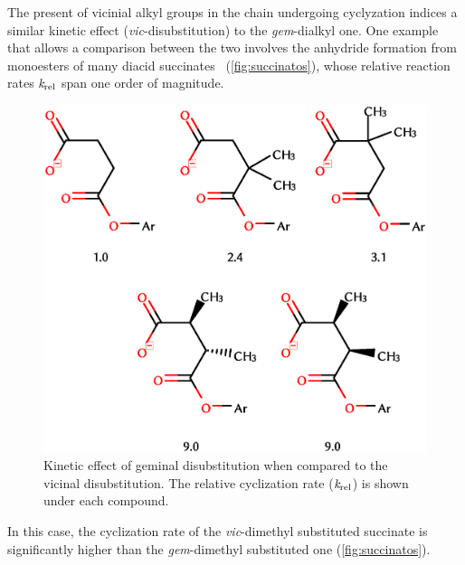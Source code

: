The present of vicinial alkyl groups in the chain undergoing cyclyzation
indices a similar kinetic effect (\emph{vic}-disubstitution)
to the \emph{gem}-dialkyl one.
One example that allows a comparison between the two
involves the anhydride formation from monoesters of many diacid
succinates~\cite{Kirby_1980,Bruice_1960a,Bruice_1960b,Bruice_1965,Lightstone_1994}
(\autoref{fig:succinatos}), whose relative reaction rates
$\emph{k}_\text{rel}$ span one order of magnitude.
%
\begin{figure}[hbtp]
    \centering
    \includegraphics[width=.75\textwidth]{figures/succinatos}
    \caption[Kinetic effects of geminal and vicinal disubstitutions.]{
        Kinetic effect of geminal disubstitution when compared to the vicinal disubstitution.
        The relative cyclization rate ($\emph{k}_\text{rel}$)
        is shown under each compound.}\label{fig:succinatos}
\end{figure}
%
In this case, the
cyclization rate
of the
\emph{vic}-dimethyl substituted
succinate
is significantly higher than the \emph{gem}-dimethyl substituted one
(\autoref{fig:succinatos}).

